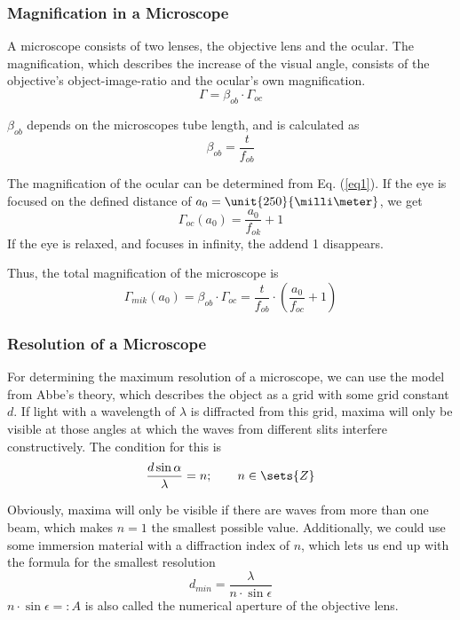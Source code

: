 \documentclass[a4paper,10pt]{article}
\begin{document}
\subsubsection*{Magnification in a Microscope}
A microscope consists of two lenses, the objective lens and the ocular. The magnification, which describes the increase of the visual angle, consists of the objective's object-image-ratio and the ocular's own magnification.
\begin{equation}
\Gamma = \beta_{ob} \cdot \Gamma_{oc}
\end{equation}

$\beta_{ob}$ depends on the microscopes tube length, and is calculated as
\begin{equation}
\beta_{ob} = \frac{t}{f_{ob}}
\end{equation}

The magnification of the ocular can be determined from Eq. (\ref{eq1}). If the eye is focused on the defined distance of $a_0 = \unit{250}{\milli\meter}$, we get
\begin{equation}
\Gamma_{oc}(a_0) = \frac{a_0}{f_{ok}}+1 \label{eqGamma}
\end{equation}
If the eye is relaxed, and focuses in infinity, the addend 1 disappears.

Thus, the total magnification of the microscope is
\begin{equation}
\Gamma_{mik}(a_0) = \beta_{ob} \cdot \Gamma_{oc}= \frac{t}{f_{ob}} \cdot \left( \frac{a_0}{f_{oc}} + 1 \right)
\end{equation}

\subsubsection*{Resolution of a Microscope}
For determining the maximum resolution of a microscope, we can use the model from Abbe's theory, which describes the object as a grid with some grid constant $d$. If light with a wavelength of $\lambda$  is diffracted from this grid, maxima will only be visible at those angles at which the waves from different slits interfere constructively. The condition for this is
\begin{equation}
\frac{d \sin \alpha}{\lambda} = n; \qquad n \in \sets{Z}
\end{equation}

Obviously, maxima will only be visible if there are waves from more than one beam, which makes $n=1$ the smallest possible value. Additionally, we could use some immersion material with a diffraction index of $n$, which lets us end up with the formula for the smallest resolution
\begin{equation}
d_{min}=\frac{\lambda}{n \cdot \sin \epsilon} \label{eqdmin}
\end{equation}
$n \cdot \sin \epsilon =: A$ is also called the numerical aperture of the objective lens.
\end{document}
